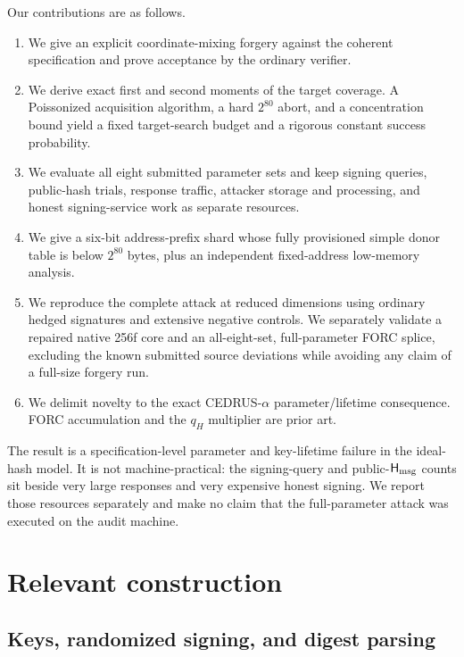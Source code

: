\documentclass[11pt,a4paper]{article}
\newcommand{\Hmsg}{\ensuremath{\mathsf{H}_{\rm msg}}}
\begin{document}
Our contributions are as follows.
\begin{enumerate}[leftmargin=*,itemsep=2pt]
  \item We give an explicit coordinate-mixing forgery against the coherent
        specification and prove acceptance by the ordinary verifier.
  \item We derive exact first and second moments of the target coverage.  A
        Poissonized acquisition algorithm, a hard $2^{80}$ abort, and a
        concentration bound yield a fixed target-search budget and a rigorous
        constant success probability.
  \item We evaluate all eight submitted parameter sets and keep signing
        queries, public-hash trials, response traffic, attacker storage and
        processing, and honest signing-service work as separate resources.
  \item We give a six-bit address-prefix shard whose fully provisioned simple
        donor table is below $2^{80}$ bytes, plus an independent fixed-address
        low-memory analysis.
  \item We reproduce the complete attack at reduced dimensions using ordinary
        hedged signatures and extensive negative controls.  We separately
        validate a repaired native 256f core and an all-eight-set,
        full-parameter FORC splice, excluding the known submitted source
        deviations while avoiding any claim of a full-size forgery run.
  \item We delimit novelty to the exact CEDRUS-$\alpha$ parameter/lifetime
        consequence.  FORC accumulation and the $q_H$ multiplier are prior
        art.
\end{enumerate}

The result is a specification-level parameter and key-lifetime failure in the
ideal-hash model.  It is not machine-practical: the signing-query and
public-$\Hmsg$ counts sit beside very large responses and very expensive honest
signing.  We report those resources separately and make no claim that the
full-parameter attack was executed on the audit machine.

\section{Relevant construction}

\subsection{Keys, randomized signing, and digest parsing}
\end{document}
